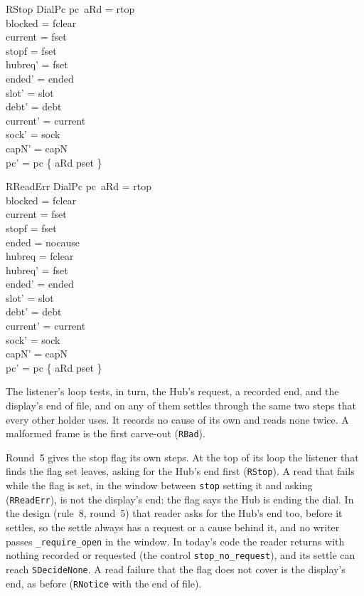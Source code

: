 \documentclass[a4paper,10pt,fleqn]{article}
\begin{document}
\begin{schema}{RStop}
  DialPc
\where
  pc~aRd = rtop \\
  blocked = fclear \\
  current = fset \\
  stopf = fset \\
  hubreq' = fset \\
  ended' = ended \\
  slot' = slot \\
  debt' = debt \\
  current' = current \\
  sock' = sock \\
  capN' = capN \\
  pc' = pc \oplus \{ aRd \mapsto pset \}
\end{schema}

\begin{schema}{RReadErr}
  DialPc
\where
  pc~aRd = rtop \\
  blocked = fclear \\
  current = fset \\
  stopf = fset \\
  ended = nocause \\
  hubreq = fclear \\
  hubreq' = fset \\
  ended' = ended \\
  slot' = slot \\
  debt' = debt \\
  current' = current \\
  sock' = sock \\
  capN' = capN \\
  pc' = pc \oplus \{ aRd \mapsto pset \}
\end{schema}

The listener's loop tests, in turn, the Hub's request, a
recorded end, and the display's end of file, and on any of them settles through
the same two steps that every other holder uses.  It records no cause of its
own and reads none twice.  A malformed frame is the first carve-out
(\texttt{RBad}).

Round~5 gives the stop flag its own steps.  At the top of its loop the listener
that finds the flag set leaves, asking for the Hub's end first (\texttt{RStop}).
A read that fails while the flag is set, in the window between \texttt{stop}
setting it and asking (\texttt{RReadErr}), is not the display's end: the flag
says the Hub is ending the dial.  In the design (rule~8, round~5) that reader asks
for the Hub's end too, before it settles, so the settle always has a request or a
cause behind it, and no writer passes \texttt{\_require\_open} in the window.  In
today's code the reader returns with nothing recorded or requested (the control
\texttt{stop\_no\_request}), and its settle can reach \texttt{SDecideNone}.  A
read failure that the flag does not cover is the display's end, as before
(\texttt{RNotice} with the end of file).
\end{document}
